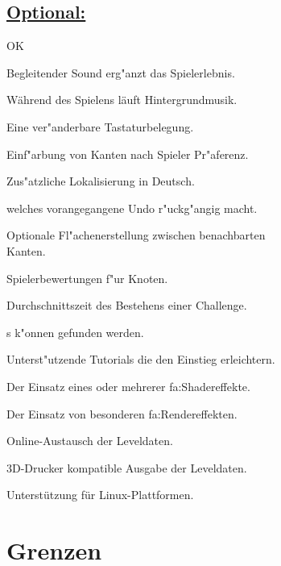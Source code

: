 \subsection*{\underline{Optional:}}

\vspace{1em}

\begin{ids}{\gls{OK}}
	
	\id[10] Begleitender Sound erg{"a}nzt das Spielerlebnis.
	
	\id[20] Während des Spielens läuft Hintergrundmusik.
	
	\id[30] Eine ver{"a}nderbare Tastaturbelegung.
	
	\id[40] Einf{"a}rbung von Kanten nach Spieler Pr{"a}ferenz.
	
	\id[50] Zus{"a}tzliche Lokalisierung in Deutsch.
	
	 welches vorangegangene Undo r{"u}ckg{"a}ngig macht.
	
	\id[70] Optionale Fl{"a}chenerstellung zwischen benachbarten \\Kanten.
	
	\id[90] Spielerbewertungen f{"u}r Knoten.
	
	\id[100] Durchschnittszeit des Bestehens einer Challenge.
	
	s k{"o}nnen gefunden werden.
	
	\id[120] Unterst{"u}tzende Tutorials die den Einstieg erleichtern.
		
	\id[130] Der Einsatz eines oder mehrerer \gls{fa:Shadereffekte}.
	
	\id[140] Der Einsatz von besonderen \gls{fa:Rendereffekte}n.
	
	\id[150] Online-Austausch der Leveldaten.
	
	\id[160] 3D-Drucker kompatible Ausgabe der Leveldaten.
	
	\id[170] Unterstützung für Linux-Plattformen.

\end{ids}


%
%
\clearpage


\section{Grenzen}
\label{UF:Grenzen}


